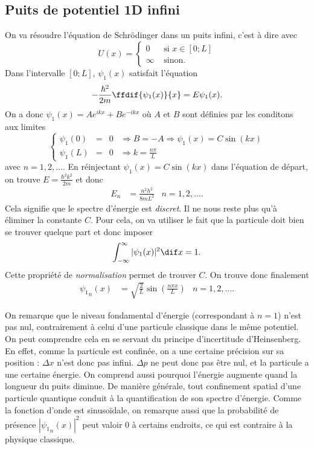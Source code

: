 \subsection{Puits de potentiel 1D infini}
\label{sec:puits-1d}
On va résoudre l'équation de Schrödinger dans un puits infini,
c'est à dire avec
\[ U(x) = \left\{
  \begin{aligned}
    0 & \text{ si } x \in [0; L]\\
    \infty & \text{ sinon}.
  \end{aligned}
\right. \]
Dans l'intervalle $[0; L]$, $\psi_1(x)$ satisfait
l'équation
\[ -\frac{\hbar^2}{2m}\ffdif{\psi_1(x)}{x} = E\psi_1(x).\]
On a donc $\psi_1(x) = Ae^{ikx}+Be^{-ikx}$ où $A$ et $B$
sont définies par les conditons aux limites
\[ \left\{
  \begin{aligned}
    \psi_1(0) &=& 0 & \Rightarrow B = -A \Rightarrow \psi_1(x) = C\sin(kx)\\
    \psi_1(L) &=& 0 & \Rightarrow k = \frac{n\pi}{L}
  \end{aligned}
\right. \]
avec $n = 1, 2, \ldots$. En réinjectant $\psi_1(x) = C\sin(kx)$
dans l'équation de départ, on trouve $E = \frac{\hbar^2k^2}{2m}$
et donc
\begin{align*}
  E_n & = \frac{n^2h^2}{8mL^2} & n = 1, 2, \ldots.
\end{align*}
Cela signifie que le spectre d'énergie est \emph{discret}.
Il ne nous reste plus qu'à éliminer la constante $C$.
Pour cela, on va utiliser le fait que la particule doit
bien se trouver quelque part et donc imposer
\[ \int_{-\infty}^{\infty} |\psi_1(x)|^2 \dif x = 1.\]
Cette propriété de \emph{normalisation} permet de trouver
$C$. On trouve donc finalement
\begin{align*}
  {\psi_1}_n(x) & =
  \sqrt{\frac{2}{L}}\sin\left(\frac{n\pi x}{L}\right) & n = 1, 2, \ldots.
\end{align*}

\begin{myrem}
	On remarque que le niveau fondamental d'énergie (correspondant
	à $n=1$) n'est pas nul, contrairement à celui d'une particule
	classique dans le même potentiel. On peut comprendre cela en
	se servant du principe d'incertitude d'Heinsenberg. En effet,
	comme la particule est confinée, on a une certaine précision
	sur sa position : $\Delta x$ n'est donc pas infini. $\Delta p$
	ne peut donc pas être nul, et la particule a une certaine énergie.
	On comprend aussi pourquoi l'énergie augmente quand la longueur
	du puits diminue. De manière générale, tout confinement
	spatial d'une particule quantique conduit à la quantification
	de son spectre d'énergie.
	Comme la fonction d'onde est sinusoïdale, on remarque aussi
	que la probabilité de présence $|{\psi_1}_n(x)|^2$ peut valoir
	0 à certains endroits, ce qui est contraire à la physique
	classique.
\end{myrem}

